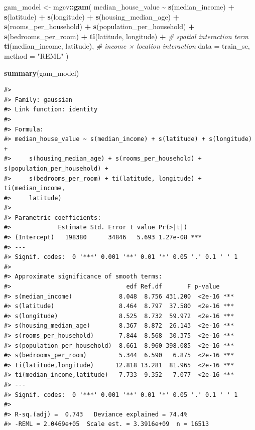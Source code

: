 \documentclass[
]{article}
\newenvironment{Shaded}{\begin{snugshade}}{\end{snugshade}}
\newcommand{\AttributeTok}[1]{\textcolor[rgb]{0.13,0.29,0.53}{#1}}
\newcommand{\CommentTok}[1]{\textcolor[rgb]{0.56,0.35,0.01}{\textit{#1}}}
\newcommand{\FunctionTok}[1]{\textcolor[rgb]{0.13,0.29,0.53}{\textbf{#1}}}
\newcommand{\NormalTok}[1]{#1}
\newcommand{\OtherTok}[1]{\textcolor[rgb]{0.56,0.35,0.01}{#1}}
\newcommand{\SpecialCharTok}[1]{\textcolor[rgb]{0.81,0.36,0.00}{\textbf{#1}}}
\newcommand{\StringTok}[1]{\textcolor[rgb]{0.31,0.60,0.02}{#1}}
\begin{document}
\begin{Shaded}
\begin{Highlighting}[]
\NormalTok{gam\_model }\OtherTok{\textless{}{-}}\NormalTok{ mgcv}\SpecialCharTok{::}\FunctionTok{gam}\NormalTok{(}
\NormalTok{  median\_house\_value }\SpecialCharTok{\textasciitilde{}}
    \FunctionTok{s}\NormalTok{(median\_income) }\SpecialCharTok{+}
    \FunctionTok{s}\NormalTok{(latitude) }\SpecialCharTok{+}
    \FunctionTok{s}\NormalTok{(longitude) }\SpecialCharTok{+}
    \FunctionTok{s}\NormalTok{(housing\_median\_age) }\SpecialCharTok{+}
    \FunctionTok{s}\NormalTok{(rooms\_per\_household) }\SpecialCharTok{+}
    \FunctionTok{s}\NormalTok{(population\_per\_household) }\SpecialCharTok{+}
    \FunctionTok{s}\NormalTok{(bedrooms\_per\_room) }\SpecialCharTok{+}
    \FunctionTok{ti}\NormalTok{(latitude, longitude) }\SpecialCharTok{+}           \CommentTok{\# spatial interaction term}
    \FunctionTok{ti}\NormalTok{(median\_income, latitude),         }\CommentTok{\# income × location interaction}
  \AttributeTok{data   =}\NormalTok{ train\_sc,}
  \AttributeTok{method =} \StringTok{"REML"}
\NormalTok{)}

\FunctionTok{summary}\NormalTok{(gam\_model)}
\end{Highlighting}
\end{Shaded}

\begin{verbatim}
#> 
#> Family: gaussian 
#> Link function: identity 
#> 
#> Formula:
#> median_house_value ~ s(median_income) + s(latitude) + s(longitude) + 
#>     s(housing_median_age) + s(rooms_per_household) + s(population_per_household) + 
#>     s(bedrooms_per_room) + ti(latitude, longitude) + ti(median_income, 
#>     latitude)
#> 
#> Parametric coefficients:
#>             Estimate Std. Error t value Pr(>|t|)    
#> (Intercept)   198380      34846   5.693 1.27e-08 ***
#> ---
#> Signif. codes:  0 '***' 0.001 '**' 0.01 '*' 0.05 '.' 0.1 ' ' 1
#> 
#> Approximate significance of smooth terms:
#>                                edf Ref.df       F p-value    
#> s(median_income)             8.048  8.756 431.200  <2e-16 ***
#> s(latitude)                  8.464  8.797  37.580  <2e-16 ***
#> s(longitude)                 8.525  8.732  59.972  <2e-16 ***
#> s(housing_median_age)        8.367  8.872  26.143  <2e-16 ***
#> s(rooms_per_household)       7.844  8.568  30.375  <2e-16 ***
#> s(population_per_household)  8.661  8.960 398.085  <2e-16 ***
#> s(bedrooms_per_room)         5.344  6.590   6.875  <2e-16 ***
#> ti(latitude,longitude)      12.818 13.281  81.965  <2e-16 ***
#> ti(median_income,latitude)   7.733  9.352   7.077  <2e-16 ***
#> ---
#> Signif. codes:  0 '***' 0.001 '**' 0.01 '*' 0.05 '.' 0.1 ' ' 1
#> 
#> R-sq.(adj) =  0.743   Deviance explained = 74.4%
#> -REML = 2.0469e+05  Scale est. = 3.3916e+09  n = 16513
\end{verbatim}
\end{document}
